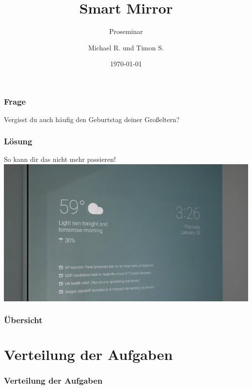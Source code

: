 \documentclass[11pt]{beamer}
\begin{document}
	\author{Michael R. und Timon S.}
	\title{Smart Mirror}
	\subtitle{Proseminar}
	\date{\today}
	
	\begin{frame}
		\titlepage
	\end{frame}

	\begin{frame}
		\frametitle{Frage}
		\centering
		\huge
		\vfill
		Vergisst du auch h\"aufig den Geburtstag deiner Großeltern?
		\vfill
	\end{frame}

	\begin{frame}
		\frametitle{L\"osung}
		\centering
		\Large
		So kann dir das nicht mehr passieren!
		\includegraphics[width = .7\paperwidth]{images/showcaseImage}
	\end{frame}

	\begin{frame}
		\frametitle{Übersicht}
		\tableofcontents
	\end{frame}

	\section{Verteilung der Aufgaben}
	\begin{frame}
		\frametitle{Verteilung der Aufgaben}
	\end{frame}
\end{document}
